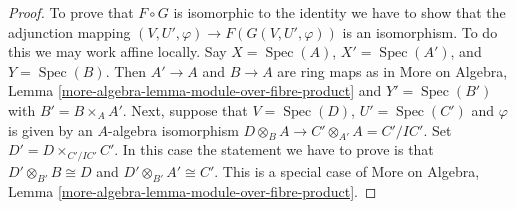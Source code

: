 \documentclass[10pt,a4paper]{amsart}
\theoremstyle{plain}
\theoremstyle{definition}
\theoremstyle{remark}
\numberwithin{equation}{subsection}
\def\Spec{\mathop{\mathrm{Spec}}}
\begin{document}
\begin{proof}
\medskip\noindent
To prove that $F \circ G$ is isomorphic to the identity we have to
show that the adjunction mapping
$(V, U', \varphi) \to F(G(V, U', \varphi))$ is an isomorphism.
To do this we may work affine locally. Say $X = \Spec(A)$, $X' = \Spec(A')$,
and $Y = \Spec(B)$. Then $A' \to A$ and $B \to A$ are ring maps as in
More on Algebra, Lemma \ref{more-algebra-lemma-module-over-fibre-product}
and $Y' = \Spec(B')$ with $B' = B \times_A A'$. Next, suppose that
$V = \Spec(D)$, $U' = \Spec(C')$ and $\varphi$ is given by an
$A$-algebra isomorphism $D \otimes_B A \to C' \otimes_{A'} A = C'/IC'$.
Set $D' = D \times_{C'/IC'} C'$. In this case the statement we have to
prove is that $D' \otimes_{B'} B \cong D$ and $D' \otimes_{B'} A' \cong C'$.
This is a special case of More on Algebra, Lemma
\ref{more-algebra-lemma-module-over-fibre-product}.
\end{proof}
\end{document}
